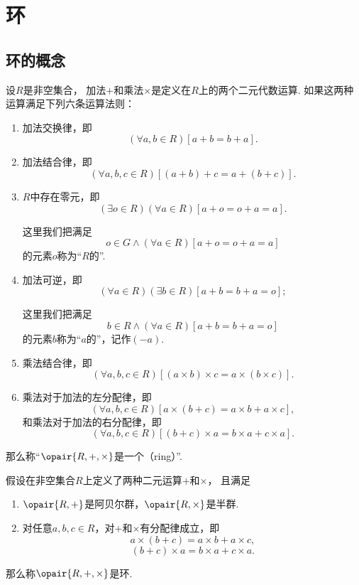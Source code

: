 \section{环}
\subsection{环的概念}
\begin{definition}\label{definition:抽象代数.环的定义}
设\(R\)是非空集合，
加法\(+\)和乘法\(\times\)是定义在\(R\)上的两个二元代数运算.
如果这两种运算满足下列六条运算法则：
\begin{enumerate}
    \item 加法交换律，即\[
        (\forall a,b \in R)[a+b = b+a].
    \]

    \item 加法结合律，即\[
        (\forall a,b,c \in R)[(a+b)+c = a+(b+c)].
    \]

    \item \(R\)中存在零元，即\[
        (\exists o \in R)(\forall a \in R)[a+o = o+a = a].
    \]

	这里我们把满足\[
		o \in G
		\land
		(\forall a \in R)[a+o = o+a = a]
	\]的元素\(o\)称为“\(R\)的”.

    \item 加法可逆，即\[
        (\forall a \in R)(\exists b \in R)[a+b = b+a = o];
    \]

	这里我们把满足\[
		b \in R
		\land
        (\forall a \in R)[a+b = b+a = o]
	\]的元素\(b\)称为“\(a\)的”，记作\((-a)\).

    \item 乘法结合律，即\[
        (\forall a,b,c \in R)
        [ (a \times b) \times c = a \times (b \times c) ].
    \]

    \item 乘法对于加法的左分配律，即\[
        (\forall a,b,c \in R)[ a \times (b+c) = a \times b + a \times c ],
    \]
    和乘法对于加法的右分配律，即\[
        (\forall a,b,c \in R)[ (b+c) \times a = b \times a + c \times a ].
    \]
\end{enumerate}
那么称“\(\opair{R,+,\times}\)是一个（ring）”.
\end{definition}

\begin{theorem}
假设在非空集合\(R\)上定义了两种二元运算\(+\)和\(\times\)，
且满足\begin{enumerate}
    \item \(\opair{R,+}\)是阿贝尔群，\(\opair{R,\times}\)是半群.

    \item 对任意\(a,b,c \in R\)，对\(+\)和\(\times\)有分配律成立，即\[
        a \times (b + c) = a \times b + a \times c,
    \]\[
        (b + c) \times a = b \times a + c \times a.
    \]
\end{enumerate}
那么称\(\opair{R,+,\times}\)是环.
\end{theorem}

